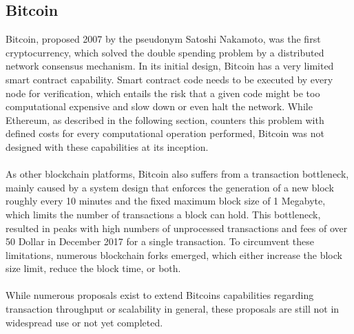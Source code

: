 \subsection{Bitcoin}
Bitcoin, proposed 2007 by the pseudonym Satoshi Nakamoto, was the first cryptocurrency, which solved the double spending problem by a distributed network consensus mechanism. In its initial design, Bitcoin has a very limited smart contract capability. Smart contract code needs to be executed by every node for verification, which entails the risk that a given code might be too computational expensive and slow down or even halt the network. While Ethereum, as described in the following section, counters this problem with defined costs for every computational operation performed, Bitcoin was not designed with these capabilities at its inception.
\\ \\
As other blockchain platforms, Bitcoin also suffers from a transaction bottleneck, mainly caused by a system design that enforces the generation of a new block roughly every 10 minutes and the fixed maximum block size of 1 Megabyte, which limits the number of transactions a block can hold. This bottleneck, resulted in peaks with high numbers of unprocessed transactions and fees of over 50 Dollar in December 2017 \cite{bitcoin-txfee:online} for a single transaction.
To circumvent these limitations, numerous blockchain forks emerged, which either increase the block size limit, reduce the block time, or both.\\ \\
While numerous proposals exist to extend Bitcoins capabilities regarding transaction throughput or scalability in general, these proposals are still not in widespread use or not yet completed.\cite{poon2016bitcoin}

